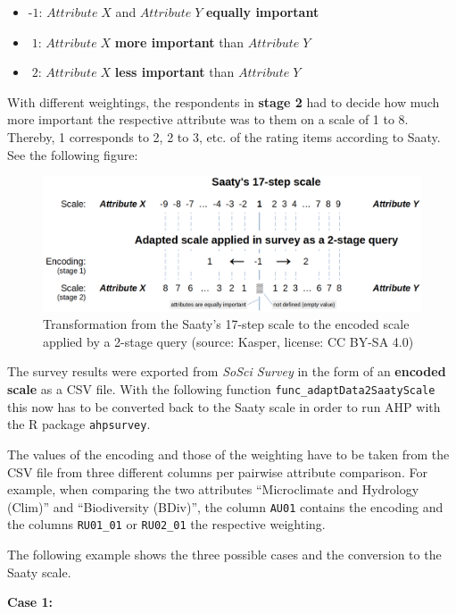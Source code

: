 \documentclass [oneside,10pt,a4paper,ngerman,BCOR10mm,headsepline,parindent,final]{scrartcl}
\providecommand{\tightlist}{%
      \setlength{\itemsep}{0pt}\setlength{\parskip}{0pt}}
\begin{document}
\begin{itemize}
\tightlist
\item
  \(\text{-}1\): \(Attribute\;X\) and \(Attribute\;Y\) \textbf{equally
  important}
\item
  \(\;1\): \(Attribute\;X\) \textbf{more important} than
  \(Attribute\;Y\)
\item
  \(\;2\): \(Attribute\;X\) \textbf{less important} than
  \(Attribute\;Y\)
\end{itemize}

    With different weightings, the respondents in \textbf{stage 2} had to
decide how much more important the respective attribute was to them on a
scale of 1 to 8. Thereby, 1 corresponds to 2, 2 to 3, etc. of the rating
items according to Saaty. See the following figure:

\begin{figure}
\centering
\includegraphics{images/Saaty_scale_to_SoSciSurvey.png}
\caption{Transformation from the Saaty's 17-step scale to the encoded
scale applied by a 2-stage query (source: Kasper, license: CC BY-SA
4.0)}
\end{figure}

The survey results were exported from \emph{SoSci Survey} in the form of
an \textbf{encoded scale} as a CSV file. With the following function
\texttt{func\_adaptData2SaatyScale} this now has to be converted back to
the Saaty scale in order to run AHP with the R package
\texttt{ahpsurvey}.

The values of the encoding and those of the weighting have to be taken
from the CSV file from three different columns per pairwise attribute
comparison. For example, when comparing the two attributes
``Microclimate and Hydrology (Clim)'' and ``Biodiversity (BDiv)'', the
column \texttt{AU01} contains the encoding and the columns
\texttt{RU01\_01} or \texttt{RU02\_01} the respective weighting.

The following example shows the three possible cases and the conversion
to the Saaty scale.

\textbf{Case 1:}
\end{document}
